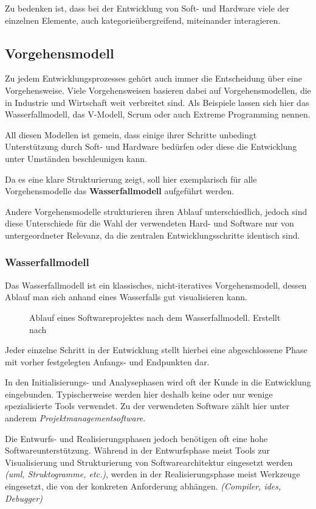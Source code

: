 Zu bedenken ist, dass bei der Entwicklung von Soft- und Hardware viele der
einzelnen Elemente, auch kategorieübergreifend, miteinander interagieren. 
\subsection{Vorgehensmodell}
Zu jedem Entwicklungsprozesses gehört auch immer die Entscheidung über eine
Vorgehensweise. Viele Vorgehensweisen basieren dabei auf Vorgehensmodellen,
die in Industrie und Wirtschaft weit verbreitet sind. Als Beispiele lassen sich
hier das Wasserfallmodell, das V-Modell, Scrum oder auch Extreme Programming
nennen.

All diesen Modellen ist gemein, dass einige ihrer Schritte
unbedingt Unterstützung durch Soft- und Hardware bedürfen oder
diese die Entwicklung unter Umständen beschleunigen kann.

Da es eine klare Strukturierung zeigt, soll hier exemplarisch für alle
Vorgehensmodelle das \textbf{Wasserfallmodell} aufgeführt werden.

Andere Vorgehensmodelle strukturieren ihren Ablauf unterschiedlich, jedoch sind
diese Unterschiede für die Wahl der verwendeten Hard- und Software nur von
untergeordneter Relevanz, da die zentralen Entwicklungsschritte
identisch sind.

\subsubsection*{Wasserfallmodell}
Das Wasserfallmodell ist ein klassisches, nicht-iteratives Vorgehensmodell,
dessen Ablauf man sich anhand eines Wasserfalls gut visualisieren kann. 

\begin{figure}[!h]
\centering
\def\svgwidth{\columnwidth}

\caption{Ablauf eines Softwareprojektes nach dem Wasserfallmodell. Erstellt nach
\cite{WP01}}
\end{figure}

Jeder einzelne Schritt in der Entwicklung stellt hierbei eine abgeschlossene
Phase mit vorher festgelegten Anfangs- und Endpunkten dar.

In den Initialisierungs- und Analysephasen wird oft der Kunde in die
Entwicklung eingebunden. Typischerweise werden hier deshalb keine oder nur
wenige spezialisierte Tools verwendet. Zu der verwendeten Software zählt hier
unter anderem \emph{Projektmanagementsoftware}.

Die Entwurfs- und Realisierungsphasen jedoch benötigen oft eine hohe
Softwareunterstützung. Während in der Entwurfsphase meist Tools zur
Visualisierung und Strukturierung von Softwarearchitektur eingesetzt werden
\emph{(\gls{uml}, Struktogramme, etc.)}, werden in der Realisierungsphase
meist Werkzeuge eingesetzt, die von der konkreten Anforderung abhängen.
\emph{(Compiler, \glspl{ide}, Debugger)}

